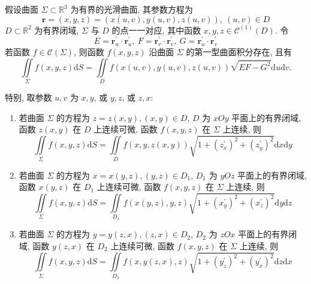 \begin{theorem}[第一型曲面积分化为二重积分]
    假设曲面 $ \varSigma \subset \mathbb{R}^{3} $ 为有界的光滑曲面, 其参数方程为
    $$\boldsymbol{r}=(x, y, z)=(x(u, v), y(u, v), z(u, v)), ~ (u, v) \in D$$
    $D \subset \mathbb{R}^{2} $ 为有界闭域, $\varSigma $ 与 $ D $ 的点一一对应, 其中函数 $ x, y, z \in \mathscr{C}^{(1)}(D) $. 令
    $$E=\boldsymbol{r}_{u}^{\prime} \cdot \boldsymbol{r}_{u}^{\prime}, ~  F=\boldsymbol{r}_{v}^{\prime} \cdot \boldsymbol{r}_{v}^{\prime}, ~  G=\boldsymbol{r}_{u}^{\prime} \cdot \boldsymbol{r}_{v}^{\prime}$$
    若函数 $ f \in \mathscr{C}(\varSigma) $, 则函数 $ f(x, y, z) $ 沿曲面 $ \varSigma $ 的第一型曲面积分存在, 且有
    $$\iint\limits_{\varSigma} f(x, y, z) \mathrm{d} S=\iint\limits_{D} f(x(u, v), y(u, v), z(u, v)) \sqrt{EF-G^{2}} \mathrm{d} u \mathrm{d} v.$$
    
    特别, 取参数 $ u, v $ 为 $ x, y $, 或 $ y, z $, 或 $ z, x $:
    \begin{enumerate}[label=(\arabic{*})]
        \item 若曲面 $ \varSigma $ 的方程为 $ z=z(x, y),(x, y) \in D$, $D $ 为 $ x O y $ 平面上的有界闭域, 函数 $ z(x, y) $ 在 $ D $ 上连续可微, 函数 $ f(x, y, z) $ 在 $ \varSigma $ 上连续, 则
              $$\iint\limits_{\varSigma} f(x, y, z) \mathrm{d} S=\iint\limits_{D} f(x, y, z(x, y)) \sqrt{1+\left(z_{x}^{\prime}\right)^{2}+\left(z_{y}^{\prime}\right)^{2}} \mathrm{d} x \mathrm{d} y$$
        \item 若曲面 $ \varSigma $ 的方程为 $ x=x(y, z),(y, z) \in D_{1}$, $D_{1} $ 为 $ y O z $ 平面上的有界闭域, 函数 $ x(y, z) $ 在 $ D_{1} $ 上连续可微, 函数 $ f(x, y, z) $ 在 $ \varSigma $ 上连续, 则
              $$\iint\limits_{\varSigma} f(x, y, z) \mathrm{d} S=\iint\limits_{D_{1}} f(x(y, z), y, z) \sqrt{1+\left(x_{y}^{\prime}\right)^{2}+\left(x_{z}^{\prime}\right)^{2}} \mathrm{d} y \mathrm{d} z$$
        \item 若曲面 $ \varSigma $ 的方程为 $ y=y(z, x),(z, x) \in D_{2}$, $D_{2} $ 为 $ z O x $ 平面上的有界闭域, 函数 $ y(z, x) $ 在 $ D_{2} $ 上连续可微, 函数 $ f(x, y, z) $ 在 $ \varSigma $ 上连续, 则
              $$\iint\limits_{\varSigma} f(x, y, z) \mathrm{d} S=\iint\limits_{D_{2}} f(x, y(z, x), z) \sqrt{1+\left(y_{z}^{\prime}\right)^{2}+\left(y_{x}^{\prime}\right)^{2}} \mathrm{d} z \mathrm{d} x$$
    \end{enumerate}
\end{theorem}

